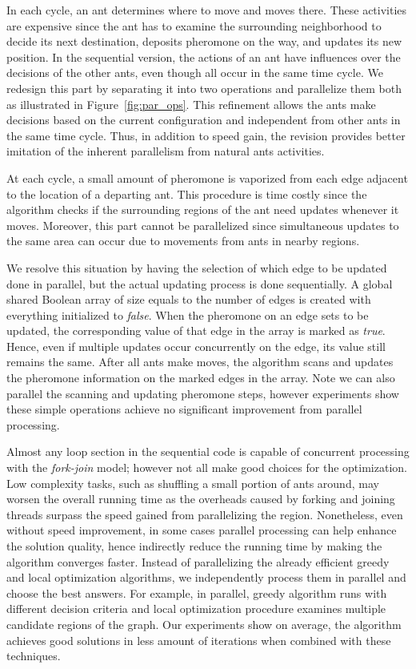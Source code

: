 \documentclass[11pt]{article}
\begin{document}
In each cycle, an ant determines where to move and moves there.  These activities are expensive since the ant has to examine the surrounding neighborhood to decide its next destination, deposits pheromone on the way, and updates its new position.  In the sequential version, the actions of an ant have influences over the decisions of the other ants, even though all occur in the same time cycle. We redesign this part by separating it into two operations and parallelize them both as illustrated in Figure~\ref{fig:par_ops}.  This refinement allows the ants make decisions based on the current configuration and independent from other ants in the same time cycle.  Thus, in addition to speed gain, the revision provides better imitation of the inherent parallelism from natural ants activities.

At each cycle, a small amount of pheromone is vaporized from each edge adjacent to the location of a departing ant. This procedure is time costly since the algorithm checks if the surrounding regions of the ant need updates whenever it moves. Moreover, this part cannot be parallelized since simultaneous updates to the same area can occur due to movements from ants in nearby regions.

We resolve this situation by having the selection of which edge to be updated done in parallel, but the actual updating process is done sequentially.  A global shared Boolean array of size equals to the number of edges is created with everything initialized to \textit{false}.  When the pheromone on an edge sets to be updated, the corresponding value of that edge in the array is marked as \textit{true}.  Hence, even if multiple updates occur concurrently on the edge, its value still remains the same. After all ants make moves, the algorithm scans and updates the pheromone information on the marked edges in the array.  Note we can also parallel the scanning and updating pheromone steps, however experiments show these simple operations achieve no significant improvement from parallel processing.

Almost any loop section in the sequential code is capable of concurrent processing with the \textit{fork-join} model; however not all make good choices for the optimization.  Low complexity tasks, such as shuffling a small portion of ants around, may worsen the overall running time as the overheads caused by forking and joining threads surpass the speed gained from parallelizing the region.  Nonetheless, even without speed improvement, in some cases parallel processing can help enhance the solution quality, hence indirectly reduce the running time by making the algorithm converges faster. Instead of parallelizing the already efficient greedy and local optimization algorithms, we independently process them in parallel and choose the best answers.  For example, in parallel, greedy algorithm runs with different decision criteria and local optimization procedure examines multiple candidate regions of the graph. Our experiments show on average, the algorithm achieves good solutions in less amount of iterations when combined with these techniques.
\end{document}
